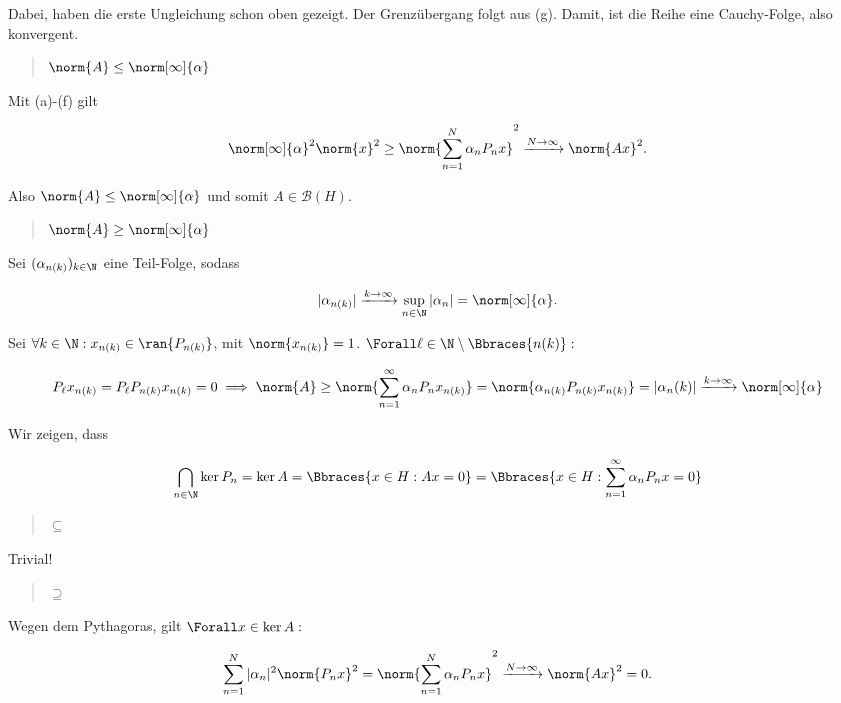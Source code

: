 \begin{solution}
Dabei, haben die erste Ungleichung schon oben gezeigt.
Der Grenzübergang folgt aus (g).
Damit, ist die Reihe eine Cauchy-Folge, also konvergent. \\

\blockquote{$\norm{A} \leq \norm[\infty]{\alpha}$}:
Mit (a)-(f) gilt

\begin{align*}
    \norm[\infty]{\alpha}^2 \norm{x}^2
    \geq
    \norm{\sum_{n = 1}^N \alpha_n P_n x}^2
    \xrightarrow{N \to \infty}
    \norm{A x}^2.
\end{align*}

Also $\norm{A} \leq \norm[\infty]{\alpha}$ und somit $A \in \mathcal{B}(H)$. \\

\blockquote{$\norm{A} \geq \norm[\infty]{\alpha}$}:
Sei $(\alpha_{n(k)})_{k \in \N}$ eine Teil-Folge, sodass

\begin{align*}
  |\alpha_{n(k)}|
  \xrightarrow{k \to \infty}
  \sup_{n \in \N} |\alpha_n|
  =
  \norm[\infty]{\alpha}.
\end{align*}

Sei $\forall k \in \N: x_{n(k)} \in \ran{P_{n(k)}}$, mit $\norm{x_{n(k)}} = 1$.
$\Forall \ell \in \N \setminus \Bbraces{n(k)}:$

\begin{align*}
  P_\ell x_{n(k)} = P_\ell P_{n(k)} x_{n(k)} = 0
  \implies
  \norm{A}
  \geq
  \norm{\sum_{n=1}^\infty \alpha_n P_n x_{n(k)}}
  =
  \norm{\alpha_{n(k)} P_{n(k)} x_{n(k)}}
  =
  |\alpha_n(k)|
  \xrightarrow{k \to \infty}
  \norm[\infty]{\alpha}
\end{align*}

Wir zeigen, dass

\begin{align*}
  \bigcap_{n \in \N} \ker{P_n}
  =
  \ker{A}
  =
  \Bbraces{x \in H: A x = 0}
  =
  \Bbraces{x \in H: \sum_{n=1}^\infty \alpha_n P_n x = 0}
\end{align*}

\blockquote{$\subseteq$}:
Trivial!

\blockquote{$\supseteq$}:
Wegen dem Pythagoras, gilt $\Forall x \in \ker{A}:$

\begin{align*}
    \sum_{n=1}^N |\alpha_n|^2 \norm{P_n x}^2
    =
    \norm{\sum_{n = 1}^N \alpha_n P_n x}^2
    \xrightarrow{N \rightarrow \infty}
    \norm{A x}^2 = 0.
\end{align*}


\end{solution}
